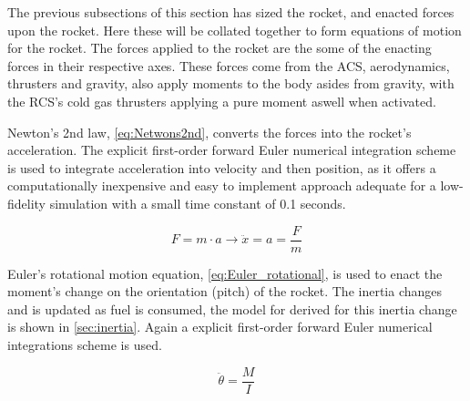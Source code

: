 The previous subsections of this section has sized the rocket, and enacted forces upon the rocket. Here these will be collated together to form equations of motion for the rocket. The forces applied to the rocket are the some of the enacting forces in their respective axes. These forces come from the ACS, aerodynamics, thrusters and gravity, also apply moments to the body asides from gravity, with the RCS's cold gas thrusters applying a pure moment aswell when activated.

Newton's 2nd law, \autoref{eq:Netwons2nd}, converts the forces into the rocket's acceleration. The explicit first-order forward Euler numerical integration scheme is used to integrate acceleration into velocity and then position, as it offers a computationally inexpensive and easy to implement approach adequate for a low-fidelity simulation with a small time constant of 0.1 seconds.

\begin{equation}
    F= m \cdot a \rightarrow \ddot{x} = a = \frac{F}{m}
\label{eq:Netwons2nd}
\end{equation}

Euler's rotational motion equation, \autoref{eq:Euler_rotational}, is used to enact the moment's change on the orientation (pitch) of the rocket. The inertia changes and is updated as fuel is consumed, the model for derived for this inertia change is shown in \autoref{sec:inertia}. Again a explicit first-order forward Euler numerical integrations scheme is used.

\begin{equation}
    \ddot{\theta} = \frac{M}{I}
\label{eq:Euler_rotational}
\end{equation}